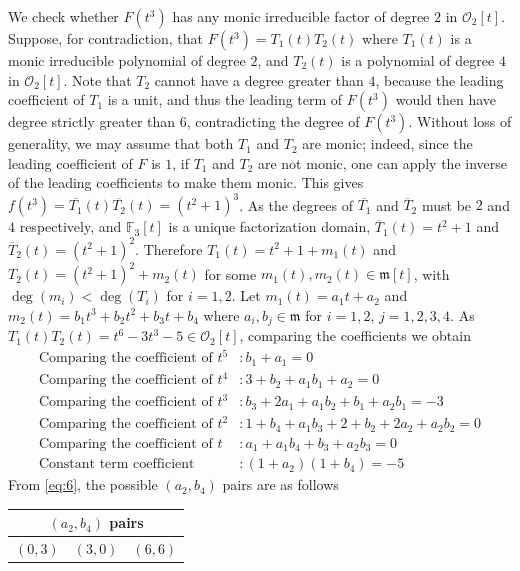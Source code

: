 \documentclass[11pt,twoside]{amsart}
\newcommand{\R}{\mathscr{O}_2}
\theoremstyle{definition} %
\begin{document}
We check whether $F(t^3)$ has any monic irreducible factor of degree $2$ in $\R[t]$.
Suppose, for contradiction, that $F(t^3) = T_1(t) T_2(t)$ where $T_1(t)$ is a monic irreducible polynomial of degree $2$, and $T_2(t)$ is a polynomial of degree $4$ in $\R[t]$.
Note that $T_2$ cannot have a degree greater than $4$, because the leading coefficient of $T_1$ is a unit, and thus the leading term of $F(t^3)$ would then have degree strictly greater than $6$, contradicting the degree of $F(t^3)$.
Without loss of generality, we may assume that both $T_1$ and $T_2$ are monic; indeed, since the leading coefficient of $F$ is $1$, if $T_1$ and $T_2$ are not monic, one can apply the inverse of the leading coefficients to make them monic.
This gives $f(t^3)=\overline{T_1}(t)\overline{T_2}(t)=(t^2+1)^3$. As the degrees of $\overline{T_1}$ and $\overline{T}_2$ must be $2$ and $4$ respectively, and $\mathbb{F}_3[t]$ is a unique factorization domain, $\overline{T}_1(t)=t^2+1$ and $\overline{T}_2(t)=(t^2+1)^2$. 
Therefore $T_1(t)=t^2+1+m_1(t)$ and $T_2(t)=(t^2+1)^2+m_2(t)$ for some $m_1(t),m_2(t)\in\mathfrak{m}[t]$, with $\deg(m_i)<\deg(T_i)$ for $i=1,2$. 
Let $m_1(t)=a_1t+a_2$ and $m_2(t)=b_1t^3+b_2t^2+b_3t+b_4$ where $a_i,b_j\in\mathfrak{m}$ for $i=1,2$, $j=1,2,3,4$.
As $T_1(t)T_2(t)=t^6-3t^3-5\in \R[t]$, comparing the coefficients we obtain 
\begin{align}
\text{Comparing the coefficient of }t^5 &: b_1 + a_1 = 0 \label{eq:1} \\
\text{Comparing the coefficient of }t^4 &: 3 + b_2 + a_1 b_1 + a_2 = 0 \label{eq:2} \\
\text{Comparing the coefficient of }t^3 &: b_3 + 2a_1 + a_1 b_2 + b_1 + a_2 b_1 = -3 \label{eq:3} \\
\text{Comparing the coefficient of }t^2 &: 1 + b_4 + a_1 b_3 + 2 + b_2 + 2a_2 + a_2 b_2 = 0 \label{eq:4} \\
\text{Comparing the coefficient of }t &: a_1 + a_1 b_4 + b_3 + a_2 b_3 = 0 \label{eq:5} \\
\text{Constant term coefficient} &: (1 + a_2)(1+b_4) = -5 \label{eq:6}
\end{align}
From \cref{eq:6}, the possible $(a_2,b_4)$ pairs are as follows
\begin{table}[h]
\centering

\begin{tabular}{ccc}
\toprule 
\multicolumn{3}{c}{$(a_2, b_4)$ pairs} \\
\midrule 
$(0, 3)$ & $(3, 0)$ & $(6, 6)$ \\
\bottomrule 
\end{tabular}

\end{table}\\
\end{document}
